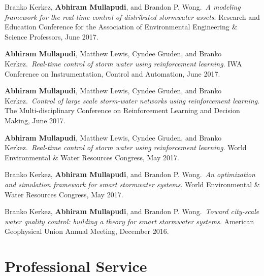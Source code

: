 \documentclass[a4paper,11pt]{article}
\newcommand{\years}[1]{%
  {\reversemarginpar\strut\marginnote{{\small#1}}}%
}
\begin{document}
\years{2017} Branko Kerkez, \textbf{Abhiram Mullapudi}, and Brandon P. Wong.\ \emph{A modeling framework for the real-time control of distributed stormwater assets}. Research and Education Conference for the Association of Environmental Engineering \& Science Professors, June 2017.\\[.1cm]

\years{2017} \textbf{Abhiram Mullapudi}, Matthew Lewis, Cyndee Gruden, and Branko Kerkez.\ \emph{Real-time control of storm water using reinforcement learning}. IWA Conference on Instrumentation, Control and Automation, June 2017.\\[.1cm]

\years{2017} \textbf{Abhiram Mullapudi}, Matthew Lewis, Cyndee Gruden, and Branko Kerkez.\ \emph{Control of large scale storm-water networks using reinforcement learning}. The Multi-disciplinary Conference on Reinforcement Learning and Decision Making, June 2017.\\[.1cm]

\years{2017} \textbf{Abhiram Mullapudi}, Matthew Lewis, Cyndee Gruden, and Branko Kerkez.\ \emph{Real-time control of storm water using reinforcement learning}. World Environmental \& Water Resources Congress, May 2017.\\[.1cm]

\years{2017} Branko Kerkez, \textbf{Abhiram Mullapudi}, and Brandon P. Wong.\ \emph{An optimization and simulation framework for smart stormwater systems}. World Environmental \& Water Resources Congress, May 2017.\\[.1cm]

\years{2016} Branko Kerkez, \textbf{Abhiram Mullapudi}, and Brandon P. Wong.\ \emph{Toward city-scale water quality control: building a theory for smart stormwater systems}. American Geophysical Union Annual Meeting, December 2016.

\section*{Professional Service}
\end{document}
